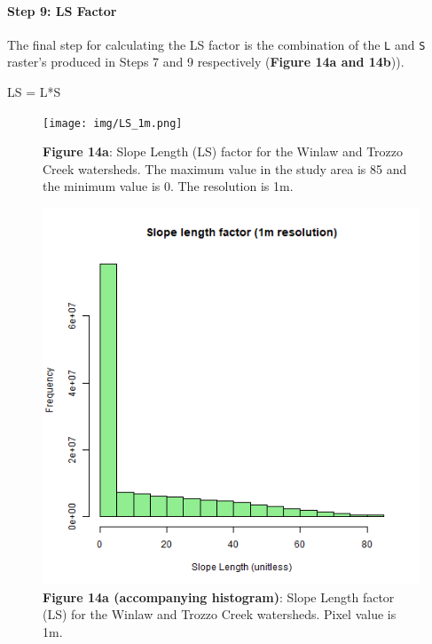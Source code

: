 \documentclass[
]{article}
\newenvironment{Shaded}{\begin{snugshade}}{\end{snugshade}}
\newcommand{\NormalTok}[1]{#1}
\newcommand{\OtherTok}[1]{\textcolor[rgb]{0.56,0.35,0.01}{#1}}
\newcommand{\SpecialCharTok}[1]{\textcolor[rgb]{0.00,0.00,0.00}{#1}}
\begin{document}
\hypertarget{sec-step-9-ls}{%
\paragraph*{Step 9: LS Factor}\label{sec-step-9-ls}}

The final step for calculating the LS factor is the combination of the \texttt{L} and \texttt{S} raster's produced in Steps 7 and 9 respectively (\textbf{Figure 14a and 14b})).

\begin{Shaded}
\begin{Highlighting}[]
\NormalTok{LS }\OtherTok{=}\NormalTok{ L}\SpecialCharTok{*}\NormalTok{S}
\end{Highlighting}
\end{Shaded}

\begin{figure}
\centering
\texttt{[image: img/LS\_1m.png]}
\caption{\textbf{Figure 14a}: Slope Length (LS) factor for the Winlaw and Trozzo Creek watersheds. The maximum value in the study area is 85 and the minimum value is 0. The resolution is 1m.}
\end{figure}

\begin{figure}
\centering
\includegraphics{img/LS_1m_hist.png}
\caption{\textbf{Figure 14a (accompanying histogram)}: Slope Length factor (LS) for the Winlaw and Trozzo Creek watersheds. Pixel value is 1m.}
\end{figure}
\end{document}
